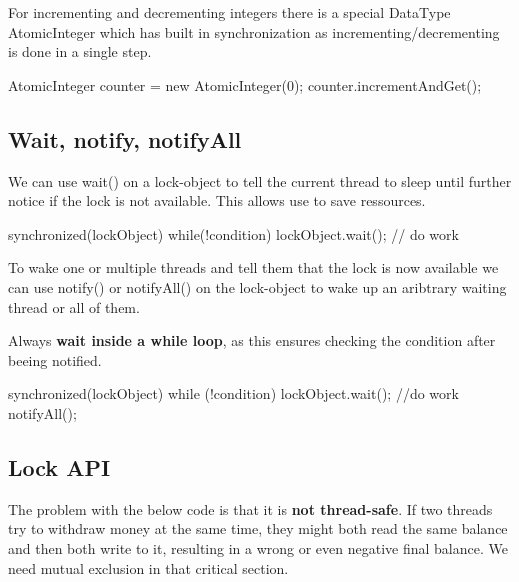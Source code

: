 For incrementing and decrementing integers there is a special DataType AtomicInteger which has built in
synchronization as incrementing/decrementing is done in a single step.

\begin{codeexample}
AtomicInteger counter = new AtomicInteger(0);
counter.incrementAndGet();
\end{codeexample}

\subsection{Wait, notify, notifyAll}

We can use wait() on a lock-object to tell the current thread to sleep until further notice if the lock is
not available. This allows use to save ressources.

\begin{codeexample}
synchronized(lockObject) {
    while(!condition) {
        lockObject.wait();
    }
    // do work  
}
\end{codeexample}

To wake one or multiple threads and tell them that the lock is now available we can use notify() or
notifyAll() on the lock-object to wake up an aribtrary waiting thread or all of them.

\begin{important}
    Always \textbf{wait inside a while loop}, as this ensures checking the condition after beeing notified.
\end{important}

\begin{codeexample}
synchronized(lockObject) {
    while (!condition) {
        lockObject.wait();
    }
    //do work
    notifyAll();
}       
\end{codeexample}

\subsection{Lock API}

\begin{example}
    The problem with the below code is that it is \textbf{not thread-safe}. If two threads try to withdraw money
    at the same time, they might both read the same balance and then both write to it, resulting in a
    wrong or even negative final balance. We need mutual exclusion in that critical section.
\end{example}

